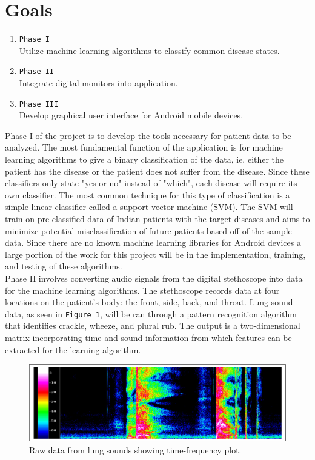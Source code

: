 \documentclass{article}
\begin{document}
\section{Goals}
\begin{enumerate}
\item[] \texttt{Phase I}\\ Utilize machine learning algorithms to classify common disease states.
\item[] \texttt{Phase II} \\ Integrate digital monitors into application.
\item[] \texttt{Phase III} \\ Develop graphical user interface for Android mobile devices.
\end{enumerate}

Phase I of the project is to develop the tools necessary for patient data to be analyzed. The most fundamental function of the application is for machine learning algorithms to give a binary classification of the data, ie. either the patient has the disease or the patient does not suffer from the disease. Since these classifiers only state "yes or no" instead of "which", each disease will require its own classifier. The most common technique for this type of classification is a simple linear classifier called a support vector machine (SVM). The SVM will train on pre-classified data of Indian patients with the target diseases and aims to minimize potential misclassification of future patients based off of the sample data. Since there are no known machine learning libraries for Android devices a large portion of the work for this project will be in the implementation, training, and testing of these algorithms. \\

Phase II involves converting audio signals from the digital stethoscope into data for the machine learning algorithms. The stethoscope records data at four locations on the patient's body: the front, side, back, and throat. Lung sound data, as seen in \texttt{Figure 1}, will be ran through a pattern recognition algorithm that identifies crackle, wheeze, and plural rub. The output is a two-dimensional matrix incorporating time and sound information from which features can be extracted for the learning algorithm.\\

\begin{figure}[H]
\minipage{\textwidth}
	\includegraphics[width=\linewidth]{images/LungSounds.png}
	\caption{Raw data from lung sounds showing time-frequency plot.}
\endminipage\hfill
\end{figure}
\end{document}
